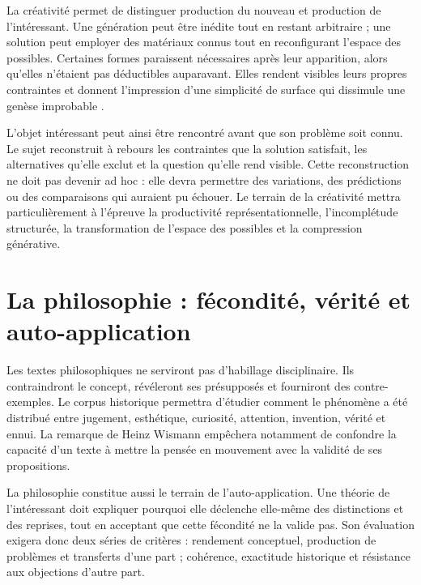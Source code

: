 \documentclass[11pt,a4paper]{article}
\begin{document}
La créativité permet de distinguer production du nouveau et production de
l'intéressant. Une génération peut être inédite tout en restant arbitraire ;
une solution peut employer des matériaux connus tout en reconfigurant l'espace
des possibles. Certaines formes paraissent nécessaires après leur apparition,
alors qu'elles n'étaient pas déductibles auparavant. Elles rendent visibles
leurs propres contraintes et donnent l'impression d'une simplicité de surface
qui dissimule une genèse improbable
\parencite{pachet2026impossibilite,pachet2027virtuosite}.

L'objet intéressant peut ainsi être rencontré avant que son problème soit
connu. Le sujet reconstruit à rebours les contraintes que la solution satisfait,
les alternatives qu'elle exclut et la question qu'elle rend visible. Cette
reconstruction ne doit pas devenir ad hoc : elle devra permettre des variations,
des prédictions ou des comparaisons qui auraient pu échouer. Le terrain de la
créativité mettra particulièrement à l'épreuve la productivité
représentationnelle, l'incomplétude structurée, la transformation de l'espace
des possibles et la compression générative.

\section{La philosophie : fécondité, vérité et auto-application}

Les textes philosophiques ne serviront pas d'habillage disciplinaire. Ils
contraindront le concept, révéleront ses présupposés et fourniront des
contre-exemples. Le corpus historique permettra d'étudier comment le phénomène a
été distribué entre jugement, esthétique, curiosité, attention, invention,
vérité et ennui. La remarque de Heinz Wismann empêchera notamment de confondre
la capacité d'un texte à mettre la pensée en mouvement avec la validité de ses
propositions.

La philosophie constitue aussi le terrain de l'auto-application. Une théorie de
l'intéressant doit expliquer pourquoi elle déclenche elle-même des distinctions
et des reprises, tout en acceptant que cette fécondité ne la valide pas. Son
évaluation exigera donc deux séries de critères : rendement conceptuel,
production de problèmes et transferts d'une part ; cohérence, exactitude
historique et résistance aux objections d'autre part.
\end{document}
